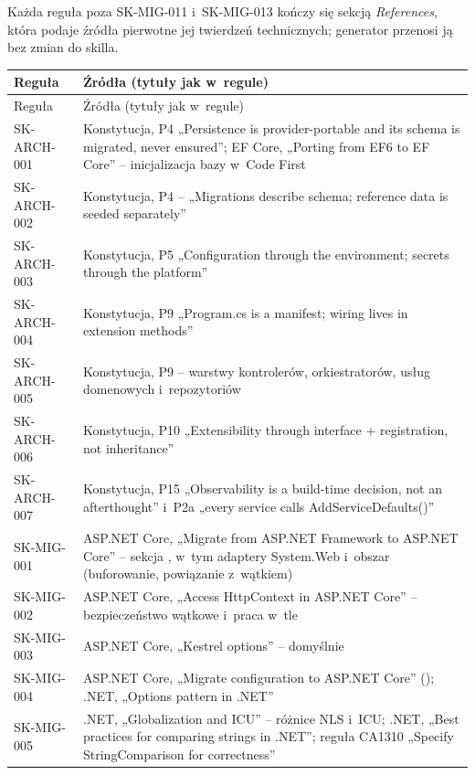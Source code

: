 Każda reguła poza SK-MIG-011 i~SK-MIG-013 kończy się sekcją \emph{References}, która podaje
źródła pierwotne jej twierdzeń technicznych; generator przenosi ją bez zmian do
 skilla.

{\small
\begin{xltabular}{\linewidth}{@{}>{\raggedright\arraybackslash}p{2.3cm} >{\raggedright\arraybackslash}X@{}}
\toprule
Reguła & Źródła (tytuły jak w~regule) \\
\midrule
\endfirsthead
\toprule
Reguła & Źródła (tytuły jak w~regule) \\
\midrule
\endhead
SK-ARCH-001 & Konstytucja, P4 „Persistence is provider-portable and its schema is migrated, never ensured”; EF Core, „Porting from EF6 to EF Core” -- inicjalizacja bazy w~Code First \\
SK-ARCH-002 & Konstytucja, P4 -- „Migrations describe schema; reference data is seeded separately” \\
SK-ARCH-003 & Konstytucja, P5 „Configuration through the environment; secrets through the platform” \\
SK-ARCH-004 & Konstytucja, P9 „Program.cs is a manifest; wiring lives in extension methods” \\
SK-ARCH-005 & Konstytucja, P9 -- warstwy kontrolerów, orkiestratorów, usług domenowych i~repozytoriów \\
SK-ARCH-006 & Konstytucja, P10 „Extensibility through interface + registration, not inheritance” \\
SK-ARCH-007 & Konstytucja, P15 „Observability is a build-time decision, not an afterthought” i~P2a „every service calls AddServiceDefaults()” \\
SK-MIG-001 & ASP.NET Core, „Migrate from ASP.NET Framework to ASP.NET Core” -- sekcja , w~tym adaptery System.Web i~obszar  (buforowanie, powiązanie z~wątkiem) \\
SK-MIG-002 & ASP.NET Core, „Access HttpContext in ASP.NET Core” -- bezpieczeństwo wątkowe i~praca w~tle \\
SK-MIG-003 & ASP.NET Core, „Kestrel options” --  domyślnie  \\
SK-MIG-004 & ASP.NET Core, „Migrate configuration to ASP.NET Core” (); .NET, „Options pattern in .NET” \\
SK-MIG-005 & .NET, „Globalization and ICU” -- różnice NLS i~ICU; .NET, „Best practices for comparing strings in .NET”; reguła CA1310 „Specify StringComparison for correctness” \\

\end{xltabular}}
